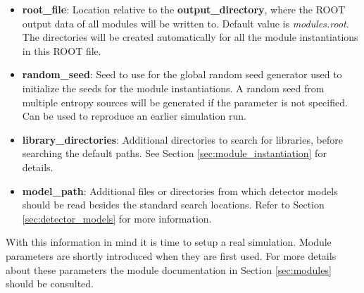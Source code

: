 \begin{itemize}
\item \textbf{root\_file}: Location relative to the \textbf{output\_directory}, where the ROOT output data of all modules will be written to. Default value is \textit{modules.root}. The directories will be created automatically for all the module instantiations in this ROOT file.
\item \textbf{random\_seed}: Seed to use for the global random seed generator used to initialize the seeds for the module instantiations. A random seed from multiple entropy sources will be generated if the parameter is not specified. Can be used to reproduce an earlier simulation run.
\item \textbf{library\_directories}: Additional directories to search for libraries, before searching the default paths. See Section \ref{sec:module_instantiation} for details.
\item \textbf{model\_path}: Additional files or directories from which detector models should be read besides the standard search locations. Refer to Section \ref{sec:detector_models} for more information.
\end{itemize}

With this information in mind it is time to setup a real simulation. Module parameters are shortly introduced when they are first used. For more details about these parameters the module documentation in Section \ref{sec:modules} should be consulted.

